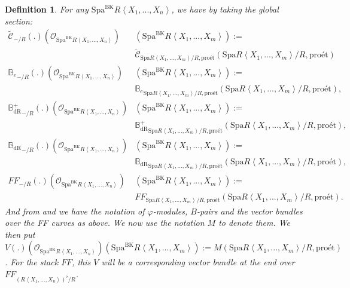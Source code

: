 \documentclass[12pt]{book}
\newtheorem{definition}{Definition}
\begin{document}
\begin{definition}
For any $\mathrm{Spa}^\mathrm{BK}R\left<X_1,...,X_n\right>$, we have by taking the global section:
\begin{align}
\widetilde{\mathcal{C}}_{-/R}(.)(\mathcal{O}_{\mathrm{Spa}^\mathrm{BK}R\left<X_1,...,X_n\right>})&(\mathrm{Spa}^\mathrm{BK}R\left<X_1,...,X_m\right>):=\\
&\widetilde{\mathcal{C}}_{\mathrm{Spa}R\left<X_1,...,X_m\right>/R,\text{pro\'et}}(\mathrm{Spa}R\left<X_1,...,X_m\right>/R,\text{pro\'et})\\
{\mathbb{B}_e}_{-/R}(.)(\mathcal{O}_{\mathrm{Spa}^\mathrm{BK}R\left<X_1,...,X_n\right>})&(\mathrm{Spa}^\mathrm{BK}R\left<X_1,...,X_m\right>):=\\
&{\mathbb{B}_e}_{\mathrm{Spa}R\left<X_1,...,X_m\right>/R,\text{pro\'et}}(\mathrm{Spa}R\left<X_1,...,X_m\right>/R,\text{pro\'et}),\\
{\mathbb{B}_\mathrm{dR}^+}_{-/R}(.)(\mathcal{O}_{\mathrm{Spa}^\mathrm{BK}R\left<X_1,...,X_n\right>})&(\mathrm{Spa}^\mathrm{BK}R\left<X_1,...,X_m\right>):=\\
&{\mathbb{B}_\mathrm{dR}^+}_{\mathrm{Spa}R\left<X_1,...,X_m\right>/R,\text{pro\'et}}(\mathrm{Spa}R\left<X_1,...,X_m\right>/R,\text{pro\'et}),\\
{\mathbb{B}_\mathrm{dR}}_{-/R}(.)(\mathcal{O}_{\mathrm{Spa}^\mathrm{BK}R\left<X_1,...,X_n\right>})&(\mathrm{Spa}^\mathrm{BK}R\left<X_1,...,X_m\right>):=\\
&{\mathbb{B}_\mathrm{dR}}_{\mathrm{Spa}R\left<X_1,...,X_m\right>/R,\text{pro\'et}}(\mathrm{Spa}R\left<X_1,...,X_m\right>/R,\text{pro\'et}),\\
{{FF}}_{-/R}(.)(\mathcal{O}_{\mathrm{Spa}^\mathrm{BK}R\left<X_1,...,X_n\right>})&(\mathrm{Spa}^\mathrm{BK}R\left<X_1,...,X_m\right>):=\\
&{FF}_{\mathrm{Spa}R\left<X_1,...,X_m\right>/R,\text{pro\'et}}(\mathrm{Spa}R\left<X_1,...,X_m\right>/R,\text{pro\'et}).
\end{align}
And from \cite[Definition 9.3.3, Definition 9.3.5, Definition 9.3.11, Definition 9.3.9]{KL1} and \cite{KL2} we have the notation of $\varphi$-modules, $B$-pairs and the vector bundles over the FF curves as above. We now use the notation $M$ to denote them. We then put $V(.)(\mathcal{O}_{\mathrm{Spa}^\mathrm{BK}R\left<X_1,...,X_n\right>})(\mathrm{Spa}^\mathrm{BK}R\left<X_1,...,X_m\right>):=M(\mathrm{Spa}R\left<X_1,...,X_m\right>/R,\text{pro\'et})$. For the stack $FF$, this $V$ will be a corresponding vector bundle at the end over $FF_{(R\left<X_1,...,X_n\right>)^\flat/R}$. 	
\end{definition}
  
\end{document}
